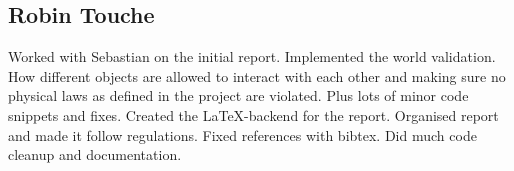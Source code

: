 \subsection*{Robin Touche}
Worked with Sebastian on the initial report.
\newline
\newline
Implemented the world validation.
How different objects are allowed to interact with each other and making sure no physical laws as defined in the project are violated.
Plus lots of minor code snippets and fixes.
\newline
\newline
Created the \LaTeX-backend for the report.
Organised report and made it follow regulations.
Fixed references with bibtex.
\newline
\newline
Did much code cleanup and documentation.

